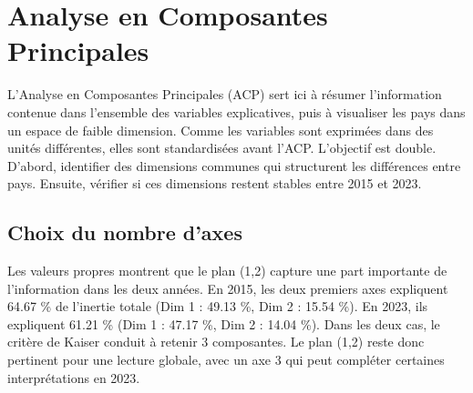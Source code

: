 \documentclass{article}
\begin{document}
\newpage
\section{Analyse en Composantes Principales}

L’Analyse en Composantes Principales (ACP) sert ici à résumer l’information contenue dans l’ensemble des variables explicatives, puis à visualiser les pays dans un espace de faible dimension.
Comme les variables sont exprimées dans des unités différentes, elles sont standardisées avant l’ACP.
L’objectif est double.
D’abord, identifier des dimensions communes qui structurent les différences entre pays.
Ensuite, vérifier si ces dimensions restent stables entre 2015 et 2023.

\subsection{Choix du nombre d’axes}

Les valeurs propres montrent que le plan (1,2) capture une part importante de l’information dans les deux années.
En 2015, les deux premiers axes expliquent 64.67 \% de l’inertie totale (Dim 1 : 49.13 \%, Dim 2 : 15.54 \%).
En 2023, ils expliquent 61.21 \% (Dim 1 : 47.17 \%, Dim 2 : 14.04 \%).
Dans les deux cas, le critère de Kaiser conduit à retenir 3 composantes.
Le plan (1,2) reste donc pertinent pour une lecture globale, avec un axe 3 qui peut compléter certaines interprétations en 2023.
\end{document}

